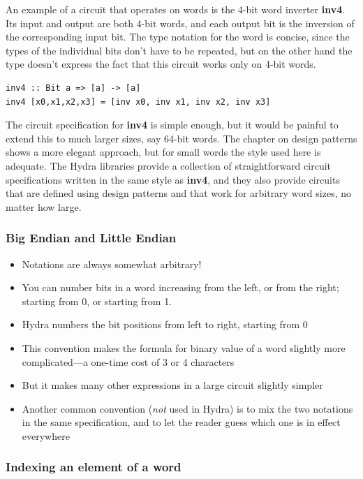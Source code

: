\documentclass[]{svmono}
\begin{document}
An example of a circuit that operates on words is the 4-bit word
inverter \textbf{inv4}.  Its input and output are both 4-bit words, and each
output bit is the inversion of the corresponding input bit.  The type
notation for the word is concise, since the types of the individual
bits don't have to be repeated, but on the other hand the type doesn't
express the fact that this circuit works only on 4-bit words.

\begin{verbatim}
inv4 :: Bit a => [a] -> [a]
inv4 [x0,x1,x2,x3] = [inv x0, inv x1, inv x2, inv x3]
\end{verbatim}

The circuit specification for \textbf{inv4} is simple enough, but it would be
painful to extend this to much larger sizes, say 64-bit words.  The
chapter on design patterns shows a more elegant approach, but for
small words the style used here is adequate.  The Hydra libraries
provide a collection of straightforward circuit specifications written
in the same style as \textbf{inv4}, and they also provide circuits that are
defined using design patterns and that work for arbitrary word sizes,
no matter how large.
\subsubsection*{Big Endian and Little Endian}
\label{sec:org78561a5}

\begin{itemize}
\item Notations are always somewhat arbitrary!
\item You can number bits in a word increasing from the left, or from
the right; starting from 0, or starting from 1.
\item Hydra numbers the bit positions from left to right, starting
from 0
\item This convention makes the formula for binary value of a word
slightly more complicated---a one-time cost of 3 or 4 characters
\item But it makes many other expressions in a large circuit slightly
simpler
\item Another common convention (\emph{not} used in Hydra) is to mix
the two notations in the same specification, and to let the reader
guess which one is in effect everywhere
\end{itemize}
\subsubsection*{Indexing an element of a word}
\label{sec:org10e8f7d}
\end{document}

